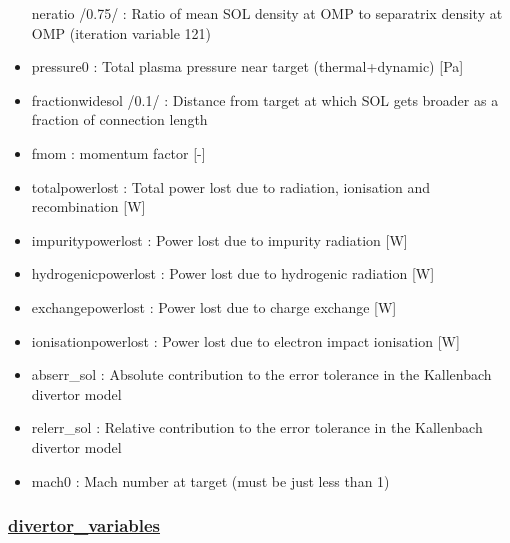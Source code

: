\documentclass[]{article}
\begin{document}
\begin{itemize}
  neratio /0.75/ : Ratio of mean SOL density at OMP to separatrix
  density at OMP (iteration variable 121)
\item
  pressure0 : Total plasma pressure near target (thermal+dynamic)
  {[}Pa{]}
\item
  fractionwidesol /0.1/ : Distance from target at which SOL gets broader
  as a fraction of connection length
\item
  fmom : momentum factor {[}-{]}
\item
  totalpowerlost : Total power lost due to radiation, ionisation and
  recombination {[}W{]}
\item
  impuritypowerlost : Power lost due to impurity radiation {[}W{]}
\item
  hydrogenicpowerlost : Power lost due to hydrogenic radiation {[}W{]}
\item
  exchangepowerlost : Power lost due to charge exchange {[}W{]}
\item
  ionisationpowerlost : Power lost due to electron impact ionisation
  {[}W{]}
\item
  abserr\_sol : Absolute contribution to the error tolerance in the
  Kallenbach divertor model
\item
  relerr\_sol : Relative contribution to the error tolerance in the
  Kallenbach divertor model
\item
  mach0 : Mach number at target (must be just less than 1)
\end{itemize}

\subsubsection{\texorpdfstring{\href{divertor_variables.html}{divertor\_variables}}{divertor\_variables}}\label{divertor_variables}
\end{document}
